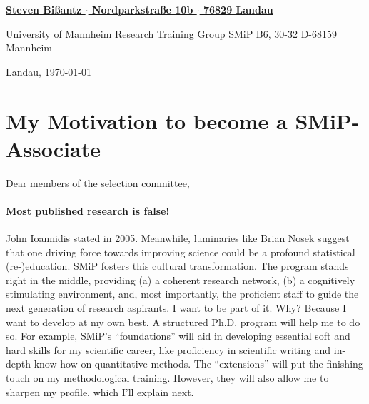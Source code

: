 \documentclass[11pt]{FreemanML}
\begin{document}
\begin{paracol}{2}

\switchcolumn %

\color{headings} %
\vspace{2cm} %
\underline{\textbf{\footnotesize{Steven Bißantz $\cdot$ Nordparkstraße 10b $\cdot$ 76829 Landau}}}

\color{text}
\bigskip
\begin{leftbar}
University of Mannheim \newline
Research Training Group SMiP \newline
B6, 30-32 \newline
D-68159 Mannheim
\end{leftbar}

\switchcolumn

\vspace{5cm}
\begin{flushright}
Landau, \today
\end{flushright}
\end{paracol} %

\vspace{1cm}
\section*{My Motivation to become a SMiP-Associate}
\bigskip
Dear members of the selection committee,
\smallskip

\onehalfspacing

\paragraph{Most published research is false!} John Ioannidis stated in 2005.
Meanwhile, luminaries like Brian Nosek suggest that one driving force towards
improving science could be a profound statistical (re-)education. SMiP fosters
this cultural transformation. The program stands right in the middle, providing
(a) a coherent research network, (b) a cognitively stimulating environment,
and, most importantly, the proficient staff to guide the next generation of
research aspirants. I want to be part of it. Why? Because I want to develop at
my own best. A structured Ph.D. program will help me to do so. For example,
SMiP's \enquote{foundations} will aid in developing essential soft and hard
skills for my scientific career, like proficiency in scientific writing and
in-depth know-how on quantitative methods. The \enquote{extensions} will put
the finishing touch on my methodological training. However, they will also
allow me to sharpen my profile, which I'll explain next. 
\end{document}

